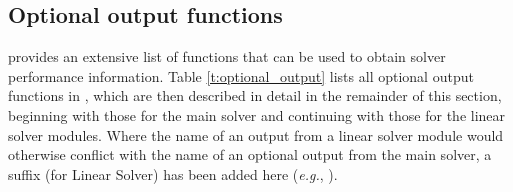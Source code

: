 \subsection{Optional output functions}\label{ss:optional_output}

{\kinsol} provides an extensive list of functions that can be used to obtain
solver performance information.
Table \ref{t:optional_output} lists all optional output functions in {\kinsol},
which are then described in detail in the remainder of this section, beginning with those
for the main {\kinsol} solver and continuing with those for the linear solver
modules. Where the name of an output from a linear solver module would otherwise conflict
with the name of an optional output from the main solver, a suffix  (for Linear Solver)
has been added here ({\em e.g.}, ).

\newlength{\colAA}
\settowidth{\colAA}{No. of $F$ calls for D.Q. Jacobian-vector evals.}
\newlength{\colBB}



